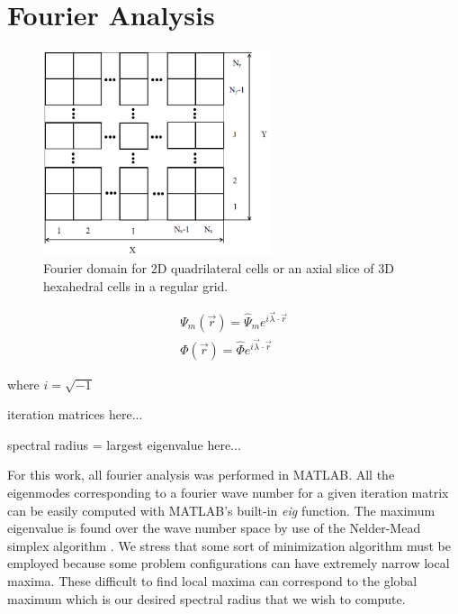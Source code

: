 \section{Fourier Analysis}
\label{sec::DSA_Fourier}

\begin{figure}
\centering
\includegraphics[width=0.60\textwidth]{figures/sec_DSA/fourier_sq_layout.png}
\caption[Fourier domain]{Fourier domain for 2D quadrilateral cells or an axial slice of 3D hexahedral cells in a regular grid.}
\label{fig::}
\end{figure}

\begin{equation}
\label{eq::fourier_sol}
\begin{aligned}
\Psi_m (\vec{r}) = \hat{\Psi}_m e^{i \vec{\lambda} \cdot \vec{r}}\\
\Phi (\vec{r}) = \hat{\Phi} e^{i \vec{\lambda} \cdot \vec{r}}
\end{aligned}
\end{equation}

\noindent where $i=\sqrt{-1}$

iteration matrices here...

spectral radius = largest eigenvalue here...

For this work, all fourier analysis was performed in MATLAB. All the eigenmodes corresponding to a fourier wave number for a given iteration matrix can be easily computed with MATLAB's built-in {\em eig} function. The maximum eigenvalue is found over the wave number space by use of the Nelder-Mead simplex algorithm \cite{nelder1965simplex}. We stress that some sort of minimization algorithm must be employed because some problem configurations can have extremely narrow local maxima. These difficult to find local maxima can correspond to the global maximum which is our desired spectral radius that we wish to compute. 

